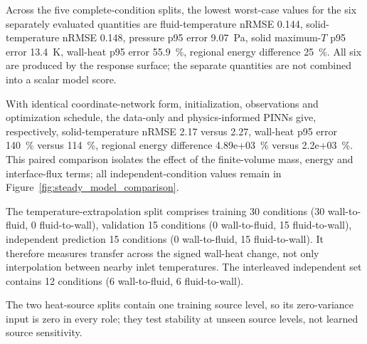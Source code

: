 Across the five complete-condition splits, the lowest worst-case values for the six separately evaluated quantities are fluid-temperature nRMSE 0.144, solid-temperature nRMSE 0.148, pressure p95 error 9.07~Pa, solid maximum-$T$ p95 error 13.4~K, wall-heat p95 error 55.9~\%, regional energy difference 25~\%. All six are produced by the response surface; the separate quantities are not combined into a scalar model score.

With identical coordinate-network form, initialization, observations and optimization schedule, the data-only and physics-informed PINNs give, respectively, solid-temperature nRMSE 2.17 versus 2.27, wall-heat p95 error 140~\% versus 114~\%, regional energy difference 4.89e+03~\% versus 2.2e+03~\%. This paired comparison isolates the effect of the finite-volume mass, energy and interface-flux terms; all independent-condition values remain in Figure~\ref{fig:steady_model_comparison}.

The temperature-extrapolation split comprises training 30 conditions (30 wall-to-fluid, 0 fluid-to-wall), validation 15 conditions (0 wall-to-fluid, 15 fluid-to-wall), independent prediction 15 conditions (0 wall-to-fluid, 15 fluid-to-wall). It therefore measures transfer across the signed wall-heat change, not only interpolation between nearby inlet temperatures. The interleaved independent set contains 12 conditions (6 wall-to-fluid, 6 fluid-to-wall).

The two heat-source splits contain one training source level, so its zero-variance input is zero in every role; they test stability at unseen source levels, not learned source sensitivity.
